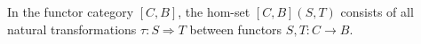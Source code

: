 In the functor category $[C, B]$, the hom-set $[C, B](S, T)$ consists of all natural transformations $\tau: S \Rightarrow T$ between functors $S, T: C \to B$.

